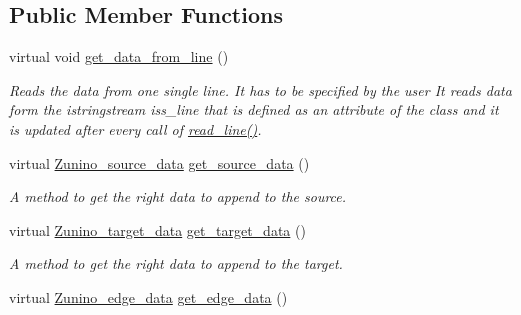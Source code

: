 \subsection*{Public Member Functions}
\begin{DoxyCompactItemize}
\item 
\hypertarget{classZunino__reader_a0d7f1b5865e3c9e4ea0d95b231781963}{
virtual void \hyperlink{classZunino__reader_a0d7f1b5865e3c9e4ea0d95b231781963}{get\_\-data\_\-from\_\-line} ()}
\label{classZunino__reader_a0d7f1b5865e3c9e4ea0d95b231781963}

\begin{DoxyCompactList}\small\item\em Reads the data from one single line. It has to be specified by the user  It reads data form the istringstream iss\_\-line that is defined as an attribute of the class and it is updated after every call of \hyperlink{classnew__reader__class_a95f6bf521a51258b14e5b5755fe5e75f}{read\_\-line()}. \item\end{DoxyCompactList}\item 
\hypertarget{classZunino__reader_a09df2a15d819e203badb5fea1fa37d48}{
virtual \hyperlink{structZunino__source__data}{Zunino\_\-source\_\-data} \hyperlink{classZunino__reader_a09df2a15d819e203badb5fea1fa37d48}{get\_\-source\_\-data} ()}
\label{classZunino__reader_a09df2a15d819e203badb5fea1fa37d48}

\begin{DoxyCompactList}\small\item\em A method to get the right data to append to the source. \item\end{DoxyCompactList}\item 
\hypertarget{classZunino__reader_a5c22d440991382506b268d2051a52826}{
virtual \hyperlink{structZunino__target__data}{Zunino\_\-target\_\-data} \hyperlink{classZunino__reader_a5c22d440991382506b268d2051a52826}{get\_\-target\_\-data} ()}
\label{classZunino__reader_a5c22d440991382506b268d2051a52826}

\begin{DoxyCompactList}\small\item\em A method to get the right data to append to the target. \item\end{DoxyCompactList}\item 
\hypertarget{classZunino__reader_a1b5acdd2df1785085d30e2a9da093afa}{
virtual \hyperlink{structZunino__edge__data}{Zunino\_\-edge\_\-data} \hyperlink{classZunino__reader_a1b5acdd2df1785085d30e2a9da093afa}{get\_\-edge\_\-data} ()}
\label{classZunino__reader_a1b5acdd2df1785085d30e2a9da093afa}


\end{DoxyCompactItemize}
